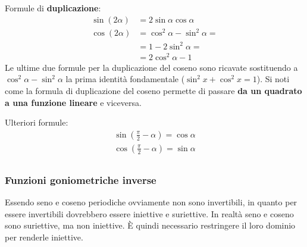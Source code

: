 Formule di \textbf{duplicazione}:\label{sec_formuleDuplicazione}
\begin{align*}
    \sin(2\alpha) &= 2\sin{\alpha}\cos{\alpha}\\
    \cos(2\alpha) &= \cos^2{\alpha} - \sin^2{\alpha} =\\
    &= 1 - 2\sin^2{\alpha} = \\
    &= 2\cos^2{\alpha} - 1
\end{align*}
Le ultime due formule per la duplicazione del coseno sono ricavate sostituendo a $\cos^2{\alpha} - \sin^2{\alpha}$ la prima identità fondamentale ($\sin^2{x} + \cos^2{x} = 1$). Si noti come la formula di duplicazione del coseno permette di passare \textbf{da un quadrato a una funzione lineare} e viceversa.

Ulteriori formule:
\begin{gather*}
    \sin\left(\frac{\pi}{2}-\alpha\right) = \cos{\alpha}\\
    \cos\left(\frac{\pi}{2}-\alpha\right) = \sin{\alpha}\\
\end{gather*}

\subsubsection{Funzioni goniometriche inverse}

Essendo seno e coseno periodiche ovviamente non sono invertibili, in quanto per essere invertibili dovrebbero essere iniettive e suriettive. In realtà seno e coseno sono suriettive, ma non iniettive. È quindi necessario restringere il loro dominio per renderle iniettive.


